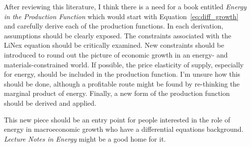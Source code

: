 \documentclass[preprint,authoryear,12pt]{elsarticle}
\begin{document}
After reviewing this literature, I think there is a need
for a book entitled \emph{Energy in the Production Function}
which would start with Equation~\ref{eq:diff_growth}
and carefully derive each of the production functions.
In each derivation, assumptions should be clearly exposed.
The constraints associated with the LiNex equation should be critically
examined.
New constraints should be introduced to round out the picture of 
economic growth in an energy- and materials-constrained world.
If possible, the price elasticity of supply, especially for energy, should be 
included in the production function.
I'm unsure how this should be done, 
although a profitable route might be found by
re-thinking the marginal product of energy.
Finally, a new form of the production function should be derived
and applied.

This new piece should be an entry point for people interested 
in the role of energy in macroeconomic growth
who have a differential equations background.
\emph{Lecture Notes in Energy} might be a good home for it.


\end{document}
